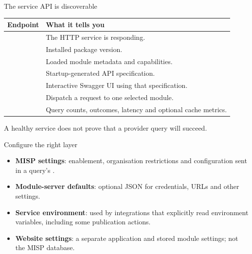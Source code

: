 \begin{frame}{The service API is discoverable}
    \small
    \begin{tabular}{P{3.1cm}P{7.1cm}}
        \toprule
        Endpoint & What it tells you \\
        \midrule
         & The HTTP service is responding. \\
         & Installed package version. \\
         & Loaded module metadata and capabilities. \\
         & Startup-generated API specification. \\
         & Interactive Swagger UI using that specification. \\
         & Dispatch a request to one selected module. \\
         & Query counts, outcomes, latency and optional cache metrics. \\
        \bottomrule
    \end{tabular}
    \medskip
    A healthy service does not prove that a provider query will succeed.
\end{frame}

\begin{frame}{Configure the right layer}
    \begin{itemize}
        \item \textbf{MISP settings}: enablement, organisation restrictions and
        configuration sent in a query's .
        \item \textbf{Module-server defaults}: optional
         JSON for credentials, URLs and other settings.
        \item \textbf{Service environment}: used by integrations that explicitly
        read environment variables, including some publication actions.
        \item \textbf{Website settings}: a separate application and stored module
        settings; not the MISP database.
    \end{itemize}
\end{frame}

